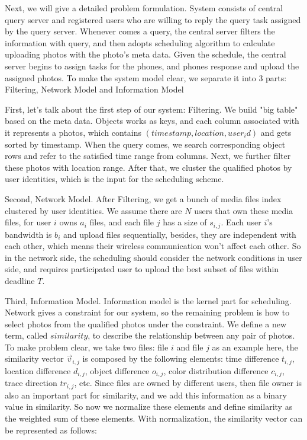 Next, we will give a detailed problem formulation. System consists of central query server and registered users who are willing to reply the query task assigned by the query server. Whenever comes a query, the central server filters the information with query, and then adopts scheduling algorithm to calculate uploading photos with the photo's meta data. Given the schedule, the central server begins to assign tasks for the phones, and phones response and upload the assigned photos. To make the system model clear, we separate it into 3 parts: Filtering, Network Model and Information Model

First, let's talk about the first step of our system: Filtering. We build "big table" based on the meta data. Objects works as keys, and each column associated with it represents a photos, which contains $(timestamp, location, user_id)$ and gets sorted by timestamp. When the query comes, we search corresponding object rows and refer to the satisfied time range from columns. Next, we further filter these photos with location range. After that, we cluster the qualified photos by user identities, which is the input for the scheduling scheme.

Second, Network Model. After Filtering, we get a bunch of  media files index clustered by user identities. We assume there are $N$ users that own these media files, for user $i$ owns $a_{i}$ files, and each file $j$ has a size of $s_{i,j}$. Each user $i$'s bandwidth is $b_{i}$ and upload files sequentially, besides, they are independent with each other, which means their wireless communication won't affect each other. So in the network side, the scheduling should consider the network conditions in user side, and requires participated user to upload the best subset of files within deadline $T$.

Third, Information Model. Information model is the kernel part for scheduling. Network  gives a constraint for our system,
 so the remaining problem is how to select photos from the qualified photos under the constraint. We define a new term, called ${similarity}$, to describe the relationship between any pair of photos. To make problem clear, we take two files: file $i$ and file $j$ as an example here, the similarity vector ${\overrightarrow{v}_{i,j}}$ is composed by the following elements: time difference ${t_{i,j}}$, location difference ${d_{i,j}}$, object difference ${o_{i,j}}$, color distribution difference ${c_{i,j}}$, trace direction ${tr_{i,j}}$, etc. Since files are owned by different users, then file owner is also an important part for similarity, and we add this information as a binary value in similarity. So now we normalize these elements and define similarity as the weighted sum of these elements. With normalization, the similarity vector can be represented as follows:

